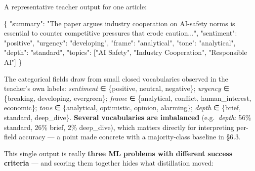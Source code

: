 \documentclass[11pt]{article}
\newenvironment{Shaded}{}{}
\newcommand{\DataTypeTok}[1]{\textcolor[rgb]{0.56,0.13,0.00}{#1}}
\newcommand{\FunctionTok}[1]{\textcolor[rgb]{0.02,0.16,0.49}{#1}}
\newcommand{\OtherTok}[1]{\textcolor[rgb]{0.00,0.44,0.13}{#1}}
\newcommand{\StringTok}[1]{\textcolor[rgb]{0.25,0.44,0.63}{#1}}
\begin{document}
A representative teacher output for one article:

\begin{Shaded}
\begin{Highlighting}[]
\FunctionTok{\{}
  \DataTypeTok{"summary"}\FunctionTok{:} \StringTok{"The paper argues industry cooperation on AI{-}safety norms is}
\StringTok{              essential to counter competitive pressures that erode caution..."}\FunctionTok{,}
  \DataTypeTok{"sentiment"}\FunctionTok{:} \StringTok{"positive"}\FunctionTok{,}
  \DataTypeTok{"urgency"}\FunctionTok{:} \StringTok{"developing"}\FunctionTok{,}
  \DataTypeTok{"frame"}\FunctionTok{:} \StringTok{"analytical"}\FunctionTok{,}
  \DataTypeTok{"tone"}\FunctionTok{:} \StringTok{"analytical"}\FunctionTok{,}
  \DataTypeTok{"depth"}\FunctionTok{:} \StringTok{"standard"}\FunctionTok{,}
  \DataTypeTok{"topics"}\FunctionTok{:} \OtherTok{[}\StringTok{"AI Safety"}\OtherTok{,} \StringTok{"Industry Cooperation"}\OtherTok{,} \StringTok{"Responsible AI"}\OtherTok{]}
\FunctionTok{\}}
\end{Highlighting}
\end{Shaded}

The categorical fields draw from small closed vocabularies observed in
the teacher's own labels: \emph{sentiment} ∈ \{positive, neutral,
negative\}; \emph{urgency} ∈ \{breaking, developing, evergreen\};
\emph{frame} ∈ \{analytical, conflict, human\_interest, economic\};
\emph{tone} ∈ \{analytical, optimistic, opinion, alarming\};
\emph{depth} ∈ \{brief, standard, deep\_dive\}. \textbf{Several
vocabularies are imbalanced} (e.g.~\emph{depth}: 56\% standard, 26\%
brief, 2\% deep\_dive), which matters directly for interpreting
per-field accuracy --- a point made concrete with a majority-class
baseline in §6.3.

This single output is really \textbf{three ML problems with different
success criteria} --- and scoring them together hides what distillation
moved:
\end{document}
